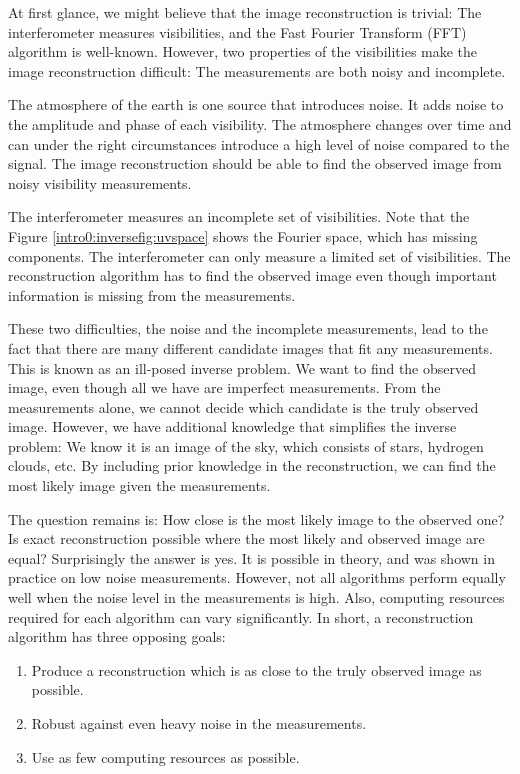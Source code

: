 At first glance, we might believe that the image reconstruction is trivial: The interferometer measures visibilities, and the Fast Fourier Transform (FFT) algorithm is well-known. However, two properties of the visibilities make the image reconstruction difficult: The measurements are both noisy and incomplete.

The atmosphere of the earth is one source that introduces noise. It adds noise to the amplitude and phase of each visibility. The atmosphere changes over time and can under the right circumstances introduce a high level of noise compared to the signal. The image reconstruction should be able to find the observed image from noisy visibility measurements.

The interferometer measures an incomplete set of visibilities. Note that the Figure \ref{intro0:inversefig:uvspace} shows the Fourier space, which has missing components. The interferometer can only measure a limited set of visibilities. The reconstruction algorithm has to find the observed image even though important information is missing from the measurements.

These two difficulties, the noise and the incomplete measurements, lead to the fact that there are many different candidate images that fit any measurements.  This is known as an ill-posed inverse problem. We want to find the observed image, even though all we have are imperfect measurements. From the measurements alone, we cannot decide which candidate is the truly observed image. However, we have additional knowledge that simplifies the inverse problem: We know it is an image of the sky, which consists of stars, hydrogen clouds, etc. By including prior knowledge in the reconstruction, we can find the most likely image given the measurements. 

The question remains is: How close is the most likely image to the observed one? Is exact reconstruction possible where the most likely and observed image are equal? Surprisingly the answer is yes. It is possible in theory\cite{candes2006robust,donoho2006compressed}, and was shown in practice on low noise measurements\cite{dabbech2018cygnus, dabbech2015moresane}. However, not all algorithms perform equally well when the noise level in the measurements is high. Also, computing resources required for each algorithm can vary significantly. In short, a reconstruction algorithm has three opposing goals:
\begin{enumerate}
	\item Produce a reconstruction which is as close to the truly observed image as possible.
	\item Robust against even heavy noise in the measurements.
	\item Use as few computing resources as possible.
\end{enumerate}

